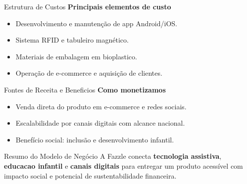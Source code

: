 \documentclass[final]{beamer}
\newlength{\sepwidth}
\newlength{\colwidth}
\newcommand{\separatorcolumn}{\begin{column}{\sepwidth}\end{column}}
\begin{document}
\begin{frame}[t]
\begin{columns}[t]
\begin{column}{\colwidth}
  \begin{block}{Estrutura de Custos}
    \textbf{Principais elementos de custo}

    \begin{itemize}
      \item Desenvolvimento e manutenção de app Android/iOS.
      \item Sistema RFID e tabuleiro magnético.
      \item Materiais de embalagem em bioplastico.
      \item Operação de e-commerce e aquisição de clientes.
    \end{itemize}
  \end{block}

  \begin{block}{Fontes de Receita e Beneficios}
    \textbf{Como monetizamos}

    \begin{itemize}
      \item Venda direta do produto em e-commerce e redes sociais.
      \item Escalabilidade por canais digitais com alcance nacional.
      \item Benefício social: inclusão e desenvolvimento infantil.
    \end{itemize}
  \end{block}

  \begin{block}{Resumo do Modelo de Negócio}
    A Fazzle conecta \textbf{tecnologia assistiva}, \textbf{educacao infantil}
    e \textbf{canais digitais} para entregar um produto acessível com impacto
    social e potencial de sustentabilidade financeira.
  \end{block}

\end{column}

\separatorcolumn
\end{columns}
\end{frame}
\end{document}
